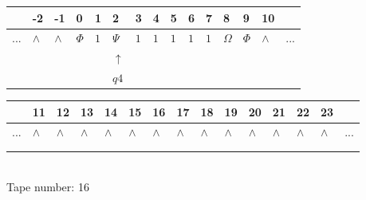 \documentclass[11pt]{article}
\begin{document}
\begin{table}[H]
\centering
\begin{tabular}{lllllllllllllll}
 & -2 & -1 & 0 & 1 & 2 & 3 & 4 & 5 & 6 & 7 & 8 & 9 & 10 & \\
\hline
$...$ & \multicolumn{1}{|l|}{$\wedge$} & \multicolumn{1}{|l|}{$\wedge$} & \multicolumn{1}{|l|}{$\Phi$} & \multicolumn{1}{|l|}{$1$} & \multicolumn{1}{|l|}{$\Psi$} & \multicolumn{1}{|l|}{$1$} & \multicolumn{1}{|l|}{$1$} & \multicolumn{1}{|l|}{$1$} & \multicolumn{1}{|l|}{$1$} & \multicolumn{1}{|l|}{$1$} & \multicolumn{1}{|l|}{$\Omega$} & \multicolumn{1}{|l|}{$\Phi$} & \multicolumn{1}{|l|}{$\wedge$} & $...$\\
\hline
&  &  &  &  & $\uparrow$ &  &  &  &  &  &  &  &  &  \\
&  &  &  &  & $ q4 $ &  &  &  &  &  &  &  &  &  \\
\end{tabular}
\begin{tabular}{lllllllllllllll}
 & 11 & 12 & 13 & 14 & 15 & 16 & 17 & 18 & 19 & 20 & 21 & 22 & 23 & \\
\hline
$...$ & \multicolumn{1}{|l|}{$\wedge$} & \multicolumn{1}{|l|}{$\wedge$} & \multicolumn{1}{|l|}{$\wedge$} & \multicolumn{1}{|l|}{$\wedge$} & \multicolumn{1}{|l|}{$\wedge$} & \multicolumn{1}{|l|}{$\wedge$} & \multicolumn{1}{|l|}{$\wedge$} & \multicolumn{1}{|l|}{$\wedge$} & \multicolumn{1}{|l|}{$\wedge$} & \multicolumn{1}{|l|}{$\wedge$} & \multicolumn{1}{|l|}{$\wedge$} & \multicolumn{1}{|l|}{$\wedge$} & \multicolumn{1}{|l|}{$\wedge$} & $...$\\
\hline
&  &  &  &  &  &  &  &  &  &  &  &  &  &  \\
&  &  &  &  &  &  &  &  &  &  &  &  &  &  \\
\end{tabular}
\\
Tape number: 16
\noindent\makebox[\linewidth]{\hdashrule{\textwidth}{1pt}{1pt}}\end{table}
\end{document}
